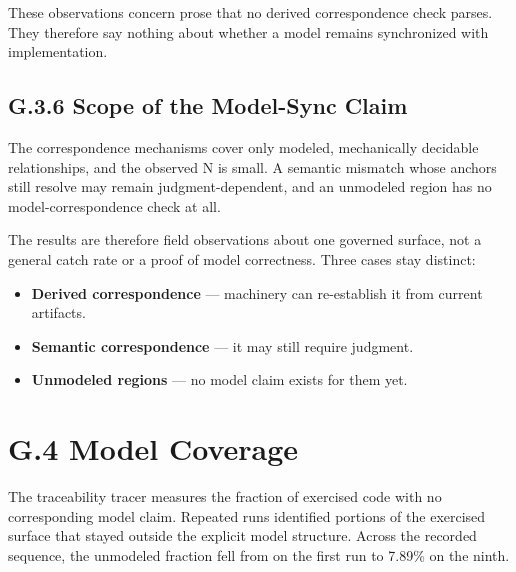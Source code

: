 These observations concern prose that no derived correspondence check parses. They therefore say nothing about whether a model remains synchronized with implementation.

\subsection{G.3.6 Scope of the Model-Sync Claim}\label{heading:model-sync-honest-reading}

The correspondence mechanisms cover only modeled, mechanically decidable relationships, and the observed N is small. A semantic mismatch whose anchors still resolve may remain judgment-dependent, and an unmodeled region has no model-correspondence check at all.

The results are therefore field observations about one governed surface, not a general catch rate or a proof of model correctness. Three cases stay distinct:

\begin{itemize}
\tightlist
\item
  \textbf{Derived correspondence} --- machinery can re-establish it from current artifacts.
\item
  \textbf{Semantic correspondence} --- it may still require judgment.
\item
  \textbf{Unmodeled regions} --- no model claim exists for them yet.
\end{itemize}

\section{G.4 Model Coverage}\label{heading:missing-model-drain}

The traceability tracer measures the fraction of exercised code with no corresponding model claim. Repeated runs identified portions of the exercised surface that stayed outside the explicit model structure. Across the recorded sequence, the unmodeled fraction fell from  on the first run to 7.89\% on the ninth.

